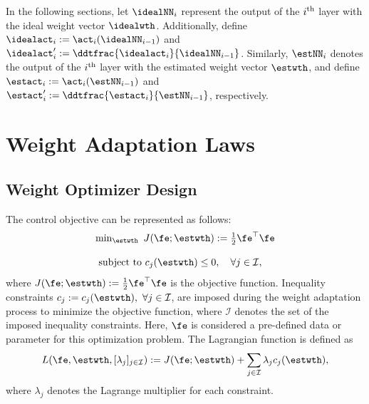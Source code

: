 \documentclass[lettersize,journal]{IEEEtran}
\begin{document}
In the following sections, let $\idealNN_i$ represent the output of the $i\textsuperscript{th}$ layer with the ideal weight vector $\idealwth$. 
Additionally, define $\idealact_i:=\act_i(\idealNN_{i-1})$ and ${\idealact}'_i:= \ddtfrac{\idealact_i}{\idealNN_{i-1}}$. 
Similarly, $\estNN_i$ denotes the output of the $i\textsuperscript{th}$ layer with the estimated weight vector $\estwth$, and define $\estact_i:=\act_i(\estNN_{i-1})$ and $\estact_i':= \ddtfrac{\estact_i}{\estNN_{i-1}}$, respectively.

\section{Weight Adaptation Laws}\label{sec:adap_laws}

\subsection{Weight Optimizer Design}\label{sec:sub:weight optimizer}

The control objective can be represented as follows:
\begin{equation}
    \begin{matrix}
        \min_{\estwth} \ J(\fe;\estwth):= 
        \tfrac{1}{2} \fe^\top \fe
        \\ \\
        \begin{aligned}
        \text{subject to }&c_{j}(\estwth) 
        \le0, \quad \forall j\in\mathcal{I},
        \end{aligned}
    \end{matrix}
    \label{eq:opt:problem1}
\end{equation}
where $J(\fe;\estwth):= \tfrac{1}{2} \fe^\top \fe$ is the objective function.
Inequality constraints $c_j:=c_j(\estwth),\ \forall j\in\mathcal{I}$, are imposed during the weight adaptation process to minimize the objective function, where $\mathcal I$ denotes the set of the imposed inequality constraints. 
Here, $\fe$ is considered a pre-defined data or parameter for this optimization problem. The Lagrangian function is defined as
\begin{equation}
    L(
        \fe,\estwth,[\lambda_j]_{j\in\mathcal I}
    ) 
    := 
    J(\fe;\estwth) 
    + 
    \sum_{j\in\mathcal I}
    \lambda_{j}
    c_{j}(\estwth)
    ,
    \label{eq:lagrangian}
\end{equation}
where $\lambda_j$ denotes the Lagrange multiplier for each constraint.
\end{document}
